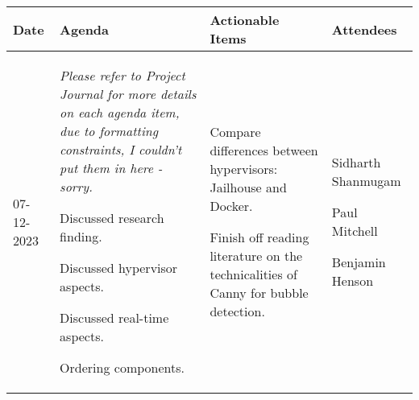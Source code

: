 \begin{table}[!h]
    \centering
    \begin{tabularx}{\textwidth}{|l|X|X|X|}
        \hline
        Date & Agenda & Actionable Items & Attendees \\
        \hline
        \hline
        07-12-2023 & 
        \begin{myitemize}
            \item \textit{Please refer to Project Journal for more details on each agenda item, due to formatting constraints, I couldn't put them in here - sorry.}
            \item Discussed research finding.
            \item Discussed hypervisor aspects.
            \item Discussed real-time aspects.
            \item Ordering components.
        \end{myitemize} &
        \begin{myitemize}
            \item Compare differences between hypervisors: Jailhouse and Docker.
            \item Finish off reading literature on the technicalities of Canny for bubble detection.
        \end{myitemize} &
        \begin{myitemize}
            \item Sidharth Shanmugam
            \item Paul Mitchell
            \item Benjamin Henson
        \end{myitemize} \\
        \hline
    \end{tabularx}
\end{table}
